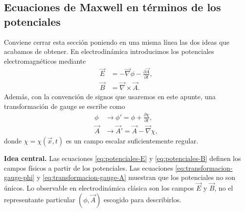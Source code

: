 \documentclass[12pt,a4paper]{article}
\theoremstyle{definition}
\theoremstyle{plain}
\numberwithin{equation}{section}
\theoremstyle{remark}
\newcommand{\E}{\vec{E}}
\newcommand{\B}{\vec{B}}
\begin{document}
\subsection{Ecuaciones de Maxwell en términos de los potenciales}

Conviene cerrar esta sección poniendo en una misma línea las dos ideas que acabamos de obtener. En electrodinámica introducimos los potenciales electromagnéticos mediante
\begin{align}
    \E &= -\vec\nabla \phi - \frac{\partial \vec A}{\partial t},
    \label{eq:potenciales-E}\\
    \B &= \vec\nabla\times\vec A.
    \label{eq:potenciales-B}
\end{align}
Además, con la convención de signos que usaremos en este apunte, una transformación de gauge se escribe como
\begin{align}
    \phi &\longrightarrow \phi' = \phi + \frac{\partial \chi}{\partial t},
    \label{eq:transformacion-gauge-phi}\\
    \vec A &\longrightarrow \vec A' = \vec A - \vec\nabla\chi,
    \label{eq:transformacion-gauge-A}
\end{align}
donde $\chi=\chi(\vec x,t)$ es un campo escalar suficientemente regular.

\begin{cajaidea}
\textbf{Idea central.} Las ecuaciones \eqref{eq:potenciales-E} y \eqref{eq:potenciales-B} definen los campos físicos a partir de los potenciales. Las ecuaciones \eqref{eq:transformacion-gauge-phi} y \eqref{eq:transformacion-gauge-A} muestran que los potenciales no son únicos. Lo observable en electrodinámica clásica son los campos $\E$ y $\B$, no el representante particular $(\phi,\vec A)$ escogido para describirlos.
\end{cajaidea}
\end{document}
